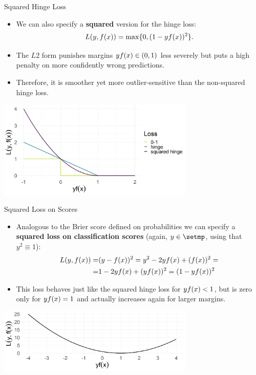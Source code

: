 \begin{vbframe}{Squared Hinge Loss}

\begin{itemize}
  \item We can also specify a \textbf{squared} version for the hinge loss:
  $$L(y, f(x)) = \max \{ 0, (1 - yf(x))^2 \}.$$
  \item The $L2$ form punishes margins $y f(x) \in (0, 1)$ less severely but puts 
  a high penalty on more confidently wrong predictions. 
  \item Therefore, it is smoother yet more outlier-sensitive than the 
  non-squared hinge loss.
\end{itemize}

\begin{center}
\includegraphics[width = 0.7\textwidth]{figure/plot_loss_hinge_squared.png}
\end{center}

\end{vbframe}


\begin{vbframe}{Squared Loss on Scores}


\begin{itemize}
  \item Analogous to the Brier score defined on probabilities we can specify a 
  \textbf{squared loss on classification scores} (again, $y \in \setmp$, using 
  that $y^2 \equiv 1$):
  \begin{eqnarray*}
  L(y, f(x)) = &(y - f(x))^2 = y^2 - 2yf(x) + (f(x))^2 =\\
  = &1 - 2yf(x) + (yf(x))^2 = (1 - yf(x))^2
  \end{eqnarray*}
  \item This loss behaves just like the squared hinge loss for $y f(x) < 1$, but 
  is zero only for $y f(x) = 1$ and actually increases again for larger margins.
\end{itemize}

\begin{center}
\includegraphics[width = 0.7\textwidth]{figure/plot_loss_squared_scores.png}
\end{center}

\end{vbframe}



